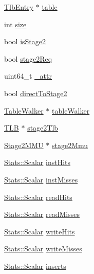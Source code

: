 \begin{DoxyCompactItemize}
\item 
\hyperlink{structArmISA_1_1TlbEntry}{TlbEntry} $\ast$ \hyperlink{classArmISA_1_1TLB_a434ae74dec9e8168e4f338aeb18d5931}{table}
\item 
int \hyperlink{classArmISA_1_1TLB_a439227feff9d7f55384e8780cfc2eb82}{size}
\item 
bool \hyperlink{classArmISA_1_1TLB_a07545f2ccf0498cfe71558779680f062}{isStage2}
\item 
bool \hyperlink{classArmISA_1_1TLB_a52120124577a3b7c28a4e8876cd36a8b}{stage2Req}
\item 
uint64\_\-t \hyperlink{classArmISA_1_1TLB_a89972e483f89fb3a1694154f97ce2d9d}{\_\-attr}
\item 
bool \hyperlink{classArmISA_1_1TLB_a16c6c6799c68307c82bc6304cf0b27b4}{directToStage2}
\item 
\hyperlink{classArmISA_1_1TableWalker}{TableWalker} $\ast$ \hyperlink{classArmISA_1_1TLB_ae4dec2d4d5730361d51d9f4b24dee89c}{tableWalker}
\item 
\hyperlink{classArmISA_1_1TLB}{TLB} $\ast$ \hyperlink{classArmISA_1_1TLB_a2188cef93e9eb4ac6383c0ca4f44dc36}{stage2Tlb}
\item 
\hyperlink{classArmISA_1_1Stage2MMU}{Stage2MMU} $\ast$ \hyperlink{classArmISA_1_1TLB_a21ea64a0a6d9600fb09fff0854fd55d7}{stage2Mmu}
\item 
\hyperlink{classStats_1_1Scalar}{Stats::Scalar} \hyperlink{classArmISA_1_1TLB_a6f516f4695aa8bb85a9a52e395689e1a}{instHits}
\item 
\hyperlink{classStats_1_1Scalar}{Stats::Scalar} \hyperlink{classArmISA_1_1TLB_ae63ad13cb56fbd34a91d2093deaafad2}{instMisses}
\item 
\hyperlink{classStats_1_1Scalar}{Stats::Scalar} \hyperlink{classArmISA_1_1TLB_a36a79efeb718e4de41970178013dac63}{readHits}
\item 
\hyperlink{classStats_1_1Scalar}{Stats::Scalar} \hyperlink{classArmISA_1_1TLB_a262cd06e148f8dd362b73ee2a8c87ce0}{readMisses}
\item 
\hyperlink{classStats_1_1Scalar}{Stats::Scalar} \hyperlink{classArmISA_1_1TLB_a1d93d3754ee97de787330f7620867026}{writeHits}
\item 
\hyperlink{classStats_1_1Scalar}{Stats::Scalar} \hyperlink{classArmISA_1_1TLB_a607353d27be8640c6f48a295794322d6}{writeMisses}
\item 
\hyperlink{classStats_1_1Scalar}{Stats::Scalar} \hyperlink{classArmISA_1_1TLB_a98ccf1b183bddae403b637838f23fa49}{inserts}

\end{DoxyCompactItemize}
